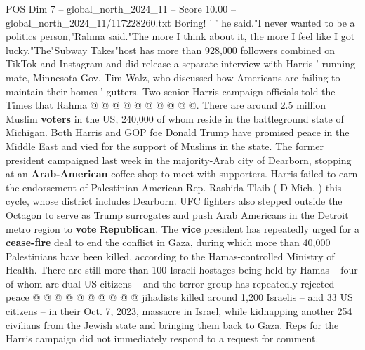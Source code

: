 \begin{textsample}{POS Dim 7 – global\_north\_2024\_11 – Score 10.00 – global\_north\_2024\_11/117228260.txt}
Boring! ' ' he said."I never wanted to be a politics person,"Rahma said."The more I think about it, the more I feel like I got lucky."The"Subway Takes"host has more than 928,000 followers combined on TikTok and Instagram and did release a separate interview with Harris ' running-mate, Minnesota Gov.
Tim Walz, who discussed how Americans are failing to maintain their homes ' gutters.
Two senior Harris campaign officials told the Times that Rahma @ @ @ @ @ @ @ @ @ @.
There are around 2.5 million Muslim \textbf{voters} in the US, 240,000 of whom reside in the battleground state of Michigan.
Both Harris and GOP foe Donald Trump have promised peace in the Middle East and vied for the support of Muslims in the state.
The former president campaigned last week in the majority-Arab city of Dearborn, stopping at an \textbf{Arab-American} coffee shop to meet with supporters.
Harris failed to earn the endorsement of Palestinian-American Rep.
Rashida Tlaib ( D-Mich. ) this cycle, whose district includes Dearborn.
UFC fighters also stepped outside the Octagon to serve as Trump surrogates and push Arab Americans in the Detroit metro region to \textbf{vote} \textbf{Republican}.
The \textbf{vice} president has repeatedly urged for a \textbf{cease-fire} deal to end the conflict in Gaza, during which more than 40,000 Palestinians have been killed, according to the Hamas-controlled Ministry of Health.
There are still more than 100 Israeli hostages being held by Hamas -- four of whom are dual US citizens -- and the terror group has repeatedly rejected peace @ @ @ @ @ @ @ @ @ @ jihadists killed around 1,200 Israelis -- and 33 US citizens -- in their Oct. 7, 2023, massacre in Israel, while kidnapping another 254 civilians from the Jewish state and bringing them back to Gaza.
Reps for the Harris campaign did not immediately respond to a request for comment.

\end{textsample}
